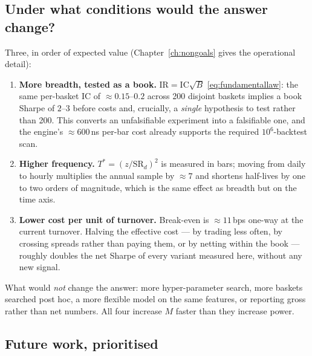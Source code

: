 \subsection{Under what conditions would the answer change?}

Three, in order of expected value (Chapter~\ref{ch:nongoals} gives the operational detail):
\begin{enumerate}
  \item \textbf{More breadth, tested as a book.} $\mathrm{IR}=\mathrm{IC}\sqrt{B}$
    \eqref{eq:fundamentallaw}: the same per-basket IC of $\approx0.15$--$0.2$ across 200
    disjoint baskets implies a book Sharpe of $2$--$3$ before costs and, crucially, a
    \emph{single} hypothesis to test rather than 200. This converts an unfalsifiable
    experiment into a falsifiable one, and the engine's $\approx600$\,ns per-bar cost
    already supports the required $10^6$-backtest scan.
  \item \textbf{Higher frequency.} $T^\ast=(z/\mathrm{SR}_d)^2$ is measured in bars; moving
    from daily to hourly multiplies the annual sample by $\approx7$ and shortens half-lives
    by one to two orders of magnitude, which is the same effect as breadth but on the time
    axis.
  \item \textbf{Lower cost per unit of turnover.} Break-even is $\approx11$\,bps one-way at
    the current turnover. Halving the effective cost --- by trading less often, by crossing
    spreads rather than paying them, or by netting within the book --- roughly doubles the
    net Sharpe of every variant measured here, without any new signal.
\end{enumerate}
What would \emph{not} change the answer: more hyper-parameter search, more baskets searched
post hoc, a more flexible model on the same features, or reporting gross rather than net
numbers. All four increase $M$ faster than they increase power.

\subsection{Future work, prioritised}

